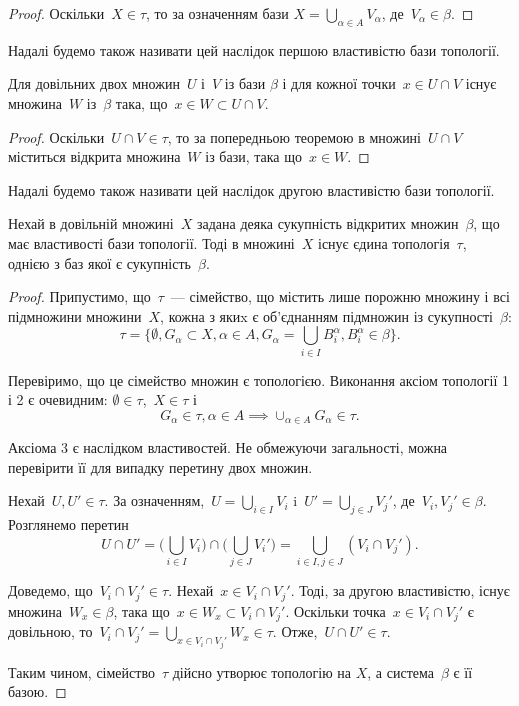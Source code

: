 \begin{proof}
Оскільки~$X \in \tau$, то за означенням бази
$X = \bigcup_{\alpha \in A} V_\alpha$, де~$V_\alpha \in \beta$.
\end{proof}

Надалі будемо також називати цей наслідок першою властивістю бази топології.

\begin{corollary}
Для довільних двох множин~$U$ і~$V$ із бази
$\beta$ і для кожної точки~$x \in U \cap V$ існує множина~$W$ із~$\beta$ така,
що~$x \in W \subset U \cap V$.
\end{corollary}

\begin{proof}
Оскільки~$U \cap V \in \tau$, то за попередньою теоремою в
множині~$U \cap V$ міститься відкрита множина~$W$ із бази, така
що~$x \in W$.
\end{proof}

Надалі будемо також називати цей наслідок другою властивістю бази топології.

\begin{theorem}
Нехай в довільній множині~$X$ задана деяка сукупність
відкритих множин~$\beta$, що має властивості бази топології. Тоді в
множині~$X$ існує єдина топологія~$\tau$, однією з баз якої є
сукупність~$\beta$.
\end{theorem}

\begin{proof}
Припустимо, що~$\tau$~--- сімейство, що містить
лише порожню множину і всі підмножини множини~$X$,
кожна з якиx є об'єднанням підмножин із сукупності~$\beta$: \[ \tau = \Bigg\{ \emptyset, G_\alpha \subset X, \alpha \in A, G_\alpha = \bigcup_{i \in I} B_i^\alpha, B_i^\alpha \in \beta \Bigg\} . \]

Перевіримо, що це сімейство множин є топологією.
Виконання аксіом топології 1 і 2 є очевидним: $\emptyset \in \tau$,~$X \in \tau$ і
\[ G_\alpha \in \tau, \alpha \in A \implies \cup_{\alpha \in A} G_\alpha \in \tau. \]

Аксіома 3 є наслідком властивостей. Не обмежуючи загальності, можна
перевірити її для випадку перетину двох множин.

Нехай~$U, U' \in \tau$. За означенням,~$U = \bigcup_{i \in I} V_i$ i~$U' = \bigcup_{j \in J} V_j'$, де~$V_i, V_j' \in \beta$. Розглянемо перетин \[ U \cap U' = \Bigg( \bigcup_{i \in I} V_i \Bigg) \cap \Bigg( \bigcup_{j \in J} V_i' \Bigg) = \bigcup_{i \in I, j \in J} (V_i \cap V_j'). \]

Доведемо, що~$V_i \cap V_j' \in \tau$. Нехай~$x \in V_i \cap V_j'$. Тоді, за
другою властивістю, існує множина~$W_x \in \beta$, така що~$x \in W_x \subset V_i \cap V_j'$. Оскільки точка~$x \in V_i \cap V_j'$ є довільною, то~$V_i \cap V_j' = \bigcup_{x \in V_i \cap V_j'} W_x \in \tau$. Отже,~$U \cap U' \in \tau$.

Таким чином, сімейство~$\tau$ дійсно утворює топологію на
$X$, а система~$\beta$ є її базою.
\end{proof}

